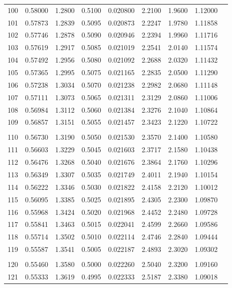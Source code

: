\documentclass[letter,twosides,10pt]{article}
\begin{document}
\begin{longtable}{|c|c|c|c|c|c|c|c|c|}
100 & 0.58000 & 1.2800 & 0.5100 & 0.020800 & 2.2100 &  1.9600 & 1.12000 \\
101 & 0.57873 & 1.2839 & 0.5095 & 0.020873 & 2.2247 &  1.9780 & 1.11858 \\
102 & 0.57746 & 1.2878 & 0.5090 & 0.020946 & 2.2394 &  1.9960 & 1.11716 \\
103 & 0.57619 & 1.2917 & 0.5085 & 0.021019 & 2.2541 &  2.0140 & 1.11574 \\
104 & 0.57492 & 1.2956 & 0.5080 & 0.021092 & 2.2688 &  2.0320 & 1.11432 \\
105 & 0.57365 & 1.2995 & 0.5075 & 0.021165 & 2.2835 &  2.0500 & 1.11290 \\
106 & 0.57238 & 1.3034 & 0.5070 & 0.021238 & 2.2982 &  2.0680 & 1.11148 \\
107 & 0.57111 & 1.3073 & 0.5065 & 0.021311 & 2.3129 &  2.0860 & 1.11006 \\
108 & 0.56984 & 1.3112 & 0.5060 & 0.021384 & 2.3276 &  2.1040 & 1.10864 \\
109 & 0.56857 & 1.3151 & 0.5055 & 0.021457 & 2.3423 &  2.1220 & 1.10722 \\
 & & & & & & & \\
110 & 0.56730 & 1.3190 & 0.5050 & 0.021530 & 2.3570 &  2.1400 & 1.10580 \\
111 & 0.56603 & 1.3229 & 0.5045 & 0.021603 & 2.3717 &  2.1580 & 1.10438 \\
112 & 0.56476 & 1.3268 & 0.5040 & 0.021676 & 2.3864 &  2.1760 & 1.10296 \\
113 & 0.56349 & 1.3307 & 0.5035 & 0.021749 & 2.4011 &  2.1940 & 1.10154 \\
114 & 0.56222 & 1.3346 & 0.5030 & 0.021822 & 2.4158 &  2.2120 & 1.10012 \\
115 & 0.56095 & 1.3385 & 0.5025 & 0.021895 & 2.4305 &  2.2300 & 1.09870 \\
116 & 0.55968 & 1.3424 & 0.5020 & 0.021968 & 2.4452 &  2.2480 & 1.09728 \\
117 & 0.55841 & 1.3463 & 0.5015 & 0.022041 & 2.4599 &  2.2660 & 1.09586 \\
118 & 0.55714 & 1.3502 & 0.5010 & 0.022114 & 2.4746 &  2.2840 & 1.09444 \\
119 & 0.55587 & 1.3541 & 0.5005 & 0.022187 & 2.4893 &  2.3020 & 1.09302 \\
 & & & & & & & \\
120 & 0.55460 & 1.3580 & 0.5000 & 0.022260 & 2.5040 &  2.3200 & 1.09160 \\
121 & 0.55333 & 1.3619 & 0.4995 & 0.022333 & 2.5187 &  2.3380 & 1.09018 \\

\end{longtable}
\end{document}

